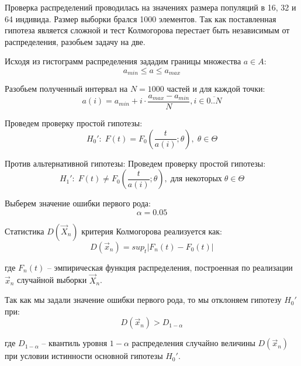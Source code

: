 Проверка распределений проводилась на значениях размера популяций в 16, 32 и 64 индивида. Размер выборки брался 1000 элементов. Так как поставленная гипотеза является сложной и тест Колмогорова перестает быть независимым от распределения, разобьем задачу на две. 

Исходя из гистограмм распределения зададим границы множества $a \in A$:
\begin{equation}
a_{min} \leq a \leq a_{max}
\end{equation}

Разобьем полученный интервал на $N = 1000$ частей и для каждой точки:
\begin{equation}
a(i) = a_{min} + i \cdot \frac{a_{max} - a_{min}}{N}, i \in \overline{0 .. N}
\end{equation}

Проведем проверку простой гипотезы:
\begin{equation}
\label{equation:distrHyp0Simple}
H_0': \; F(t) = F_0(\frac{t}{a(i)};\theta), \; \theta \in \Theta
\end{equation}

Против альтернативной гипотезы:
Проведем проверку простой гипотезы:
\begin{equation}
\label{equation:distrHyp1Simple}
H_1': \; F(t) \neq F_0(\frac{t}{a(i)};\theta), \; \text{для некоторых} \; \theta \in \Theta
\end{equation}

Выберем значение ошибки первого рода:
\begin{equation}
\alpha = 0.05
\end{equation}

Статистика $D(\vec{X}_n)$ критерия Колмогорова реализуется как:
\begin{equation}
D(\vec{x}_n) = sup_t | F_n(t) - F_0(t) |
\end{equation}
\begin{ESKDExplanation}
\item[где ] $F_n(t)$ -- эмпирическая функция распределения, построенная по реализации $\vec{x}_n$ случайной выборки $\vec{X}_n$.
\end{ESKDExplanation}

Так как мы задали значение ошибки первого рода, то мы отклоняем гипотезу $H_0'$ при:
\begin{equation}
D(\vec{x}_n) > D_{1 - \alpha}
\end{equation}
\begin{ESKDExplanation}
\item[где ] $D_{1 - \alpha}$ -- квантиль уровня $1 - \alpha$ распределения случайно величины $D(\vec{x}_n)$ при условии истинности основной гипотезы $H_0'$.
\end{ESKDExplanation}

